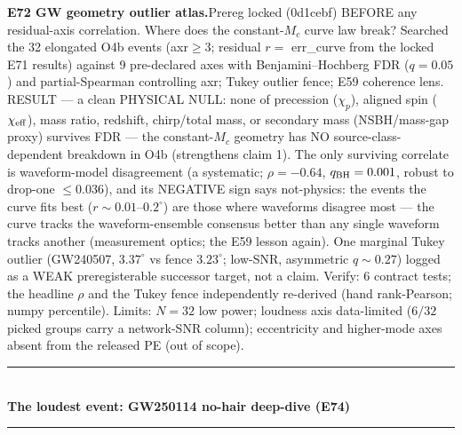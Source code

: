 \documentclass[10pt]{article}
\newcommand{\entry}[2]{\vspace{5pt}\noindent\textbf{#1}\quad #2\par}
\newcommand{\grouphead}[1]{\vspace{9pt}\noindent\rule{\linewidth}{0.4pt}\\[-2pt]{\small\textbf{#1}}\\[-4pt]\rule{\linewidth}{0.4pt}\par\vspace{2pt}}
\begin{document}
\entry{E72 GW geometry outlier atlas.}{Prereg locked (0d1cebf) BEFORE any residual-axis correlation.
Where does the constant-$M_c$ curve law break? Searched the 32 elongated O4b events (axr$\ge3$;
residual $r=$ err\_curve from the locked E71 results) against 9 pre-declared axes with
Benjamini--Hochberg FDR ($q=0.05$) and partial-Spearman controlling axr; Tukey outlier fence; E59
coherence lens. RESULT --- a clean PHYSICAL NULL: none of precession ($\chi_p$), aligned spin
($\chi_{\rm eff}$), mass ratio, redshift, chirp/total mass, or secondary mass (NSBH/mass-gap proxy)
survives FDR --- the constant-$M_c$ geometry has NO source-class-dependent breakdown in O4b
(strengthens claim 1). The only surviving correlate is waveform-model disagreement (a systematic;
$\rho=-0.64$, $q_{\rm BH}=0.001$, robust to drop-one $\le0.036$), and its NEGATIVE sign says
not-physics: the events the curve fits best ($r\sim0.01$--$0.2^\circ$) are those where waveforms
disagree most --- the curve tracks the waveform-ensemble consensus better than any single waveform
tracks another (measurement optics; the E59 lesson again). One marginal Tukey outlier (GW240507,
$3.37^\circ$ vs fence $3.23^\circ$; low-SNR, asymmetric $q\sim0.27$) logged as a WEAK preregisterable
successor target, not a claim. Verify: 6 contract tests; the headline $\rho$ and the Tukey fence
independently re-derived (hand rank-Pearson; numpy percentile). Limits: $N=32$ low power; loudness axis
data-limited ($6/32$ picked groups carry a network-SNR column); eccentricity and higher-mode axes
absent from the released PE (out of scope).}

\grouphead{The loudest event: GW250114 no-hair deep-dive (E74)}
\end{document}
